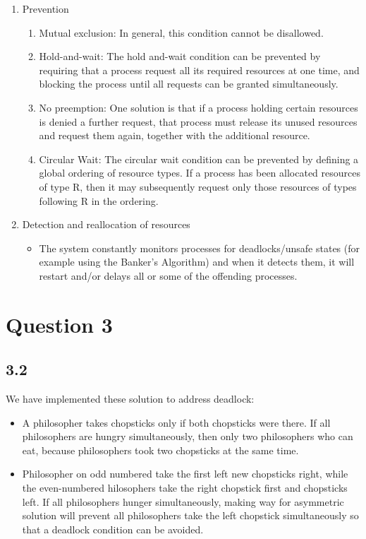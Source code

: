 \documentclass[11pt, letterpaper]{article}
\begin{document}
\begin{enumerate}
    \item Prevention
        \begin{enumerate}[label=\arabic*.]
            \item Mutual exclusion: In general, this condition cannot be disallowed.
            \item Hold-and-wait: The hold and-wait condition can be prevented by requiring that a process request all its required resources at one time, and blocking the process until all requests can be granted simultaneously.
            \item No preemption: One solution is that if a process holding certain resources is denied a further request, that process must release its unused resources and request them again, together with the additional resource.
            \item Circular Wait: The circular wait condition can be prevented by defining a global ordering of resource types. If a process has been allocated resources of type R, then it may subsequently request only those resources of types following R in the ordering.
        \end{enumerate}
    \item Detection and reallocation of resources
        \begin{itemize}
            \item The system constantly monitors processes for deadlocks/unsafe states (for example using the Banker’s Algorithm) and when it detects them, it will restart and/or delays all or some of the offending processes.
        \end{itemize}
\end{enumerate}
\pagebreak

\section*{Question 3}
\subsection*{3.2}

We have implemented these solution to address deadlock:
\begin{itemize}
	\item A philosopher takes chopsticks only if both chopsticks were there. If all philosophers are hungry simultaneously, then only two philosophers who can eat, because philosophers took two chopsticks at the
same time.
	\item Philosopher on odd numbered take the first left new chopsticks right, while the even-numbered hilosophers take the right chopstick first and chopsticks left. If all philosophers hunger simultaneously, making way for asymmetric solution will prevent all philosophers take the left chopstick simultaneously so that a deadlock condition can be avoided.
\end{itemize}
\end{document}
